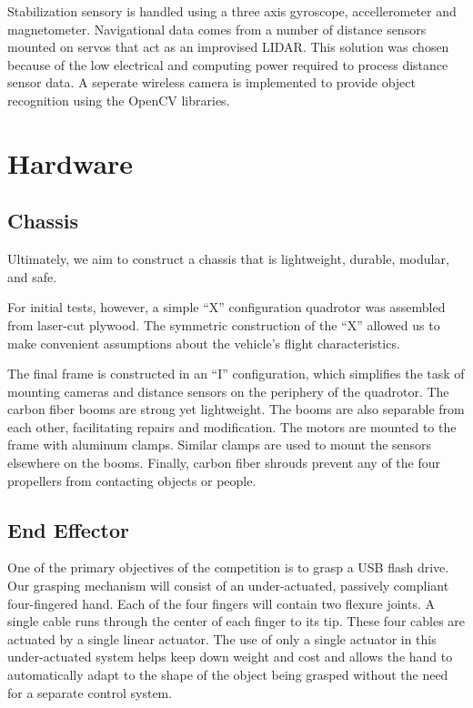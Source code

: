 \documentclass[12pt,letterpaper]{article}
\begin{document}
Stabilization sensory is handled using a three axis gyroscope, accellerometer
and magnetometer. Navigational data comes from a number of distance sensors
mounted on servos that act as an improvised LIDAR. This solution was chosen
because of the low electrical and computing power required to process distance
sensor data. A seperate wireless camera is implemented to provide object
recognition using the OpenCV libraries.


\section*{Hardware}

\subsection*{Chassis}

Ultimately, we aim to construct a chassis that is lightweight, durable, modular, and safe.

For initial tests, however, a simple ``X'' configuration quadrotor was
assembled from laser-cut plywood. The symmetric construction of the ``X''
allowed us to make convenient assumptions about the vehicle's flight
characteristics.

The final frame is constructed in an ``I'' configuration, which simplifies the
task of mounting cameras and distance sensors on the periphery of the
quadrotor. The carbon fiber booms are strong yet lightweight. The booms are
also separable from each other, facilitating repairs and modification. The
motors are mounted to the frame with aluminum clamps. Similar clamps are used
to mount the sensors elsewhere on the booms. Finally, carbon fiber shrouds
prevent any of the four propellers from contacting objects or people.


\subsection*{End Effector}

One of the primary objectives of the competition is to grasp a USB flash drive.
Our grasping mechanism will consist of an under-actuated, passively compliant
four-fingered hand. Each of the four fingers will contain two flexure joints. A
single cable runs through the center of each finger to its tip. These four
cables are actuated by a single linear actuator. The use of only a single
actuator in this under-actuated system helps keep down weight and cost and
allows the hand to automatically adapt to the shape of the object being grasped
without the need for a separate control system.
\end{document}
